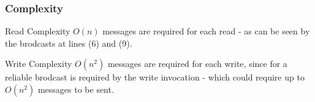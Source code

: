 \begin{frame}
    \frametitle{Complexity}
    
    \begin{block}{Read Complexity}
        \alert{$O(n)$} messages are required for each read - as can be seen
        by the brodcasts at lines (6) and (9).
    \end{block}
    \begin{block}{Write Complexity}
        \alert{$O(n^2)$} messages are required for each write,
        since for a \alert{reliable} brodcast is required
        by the write invocation - which could require up to $O(n^2)$
        messages to be sent. 
    \end{block}
\end{frame}